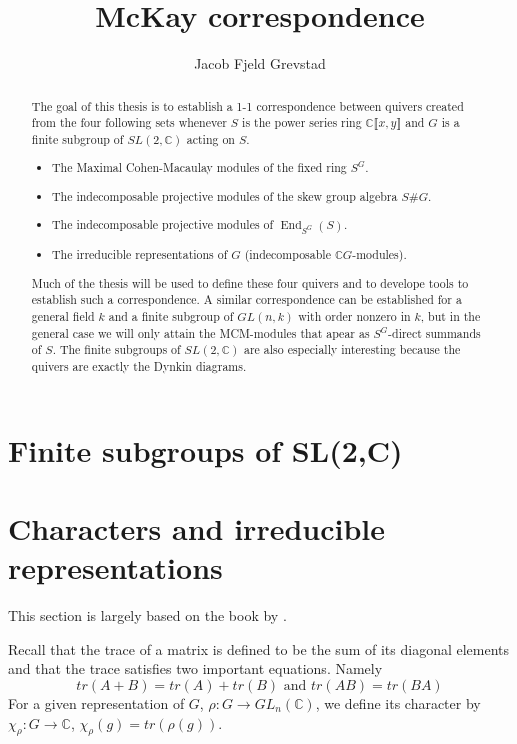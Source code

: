\documentclass[11pt, a4paper, english]{article}
\numberwithin{prop}{section}
\numberwithin{lemma}{section}
\numberwithin{theorem}{section}
\numberwithin{defin}{section}
\numberwithin{example}{section}
\newcommand{\C}{\mathbb{C}}
\DeclareMathOperator{\End}{End}
\begin{document}
\title{McKay correspondence}
\author{Jacob Fjeld Grevstad}
\maketitle

\begin{abstract}
The goal of this thesis is to establish a 1-1 correspondence between quivers created from the four following sets whenever $S$ is the power series ring $\C \llbracket x, y \rrbracket$ and $G$ is a finite subgroup of $SL(2,\C)$ acting on $S$.
\begin{itemize}
\item The Maximal Cohen-Macaulay modules of the fixed ring $S^G$.
\item The indecomposable projective modules of the skew group algebra $S\#G$.
\item The indecomposable projective modules of $\End_{S^G}(S)$.
\item The irreducible representations of $G$ (indecomposable $\C G$-modules).
\end{itemize}
Much of the thesis will be used to define these four quivers and to develope tools to establish such a correspondence. A similar correspondence can be established for a general field $k$ and a finite subgroup of $GL(n, k)$ with order nonzero in $k$, but in the general case we will only attain the MCM-modules that apear as $S^G$-direct summands of $S$. The finite subgroups of $SL(2, \C)$ are also especially interesting because the quivers are exactly the Dynkin diagrams.
\end{abstract}

\tableofcontents

\iffalse
\section{Finite subgroups of SL(2,C)}

\section{Characters and irreducible representations}
This section is largely based on the book by \cite{RCG}.

Recall that the trace of a matrix is defined to be the sum of its diagonal elements and that the trace satisfies two important equations. Namely
$$tr(A+B)=tr(A)+tr(B) \text{  and  } tr(AB)=tr(BA)$$
For a given representation of $G$, $\rho: G \to GL_n(\mathbb{C})$, we define its character by $\chi_\rho : G \to \mathbb{C}$, $\chi_\rho(g) = tr(\rho(g))$.
\end{document}
